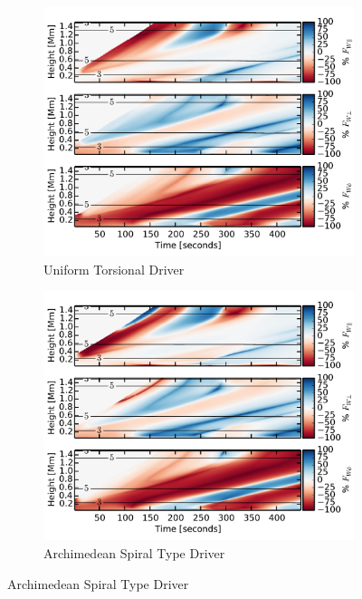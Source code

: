 \begin{figure}
    \begin{subfigure}[b]{0.49\textwidth}
        \includegraphics[width=\columnwidth]{Chapter4/Figs/WaveFlux_TD_Percent_Suni_p240_A10_r30_B0.pdf}
        \caption{Uniform Torsional Driver}
    \end{subfigure}
    \begin{subfigure}[b]{0.49\textwidth}
        \includegraphics[width=\columnwidth]{Chapter4/Figs/WaveFlux_TD_Percent_Sarch_p240_A10_r30_B0005.pdf}
        \caption{Archimedean Spiral Type Driver}
    \end{subfigure}
    

\end{figure}
